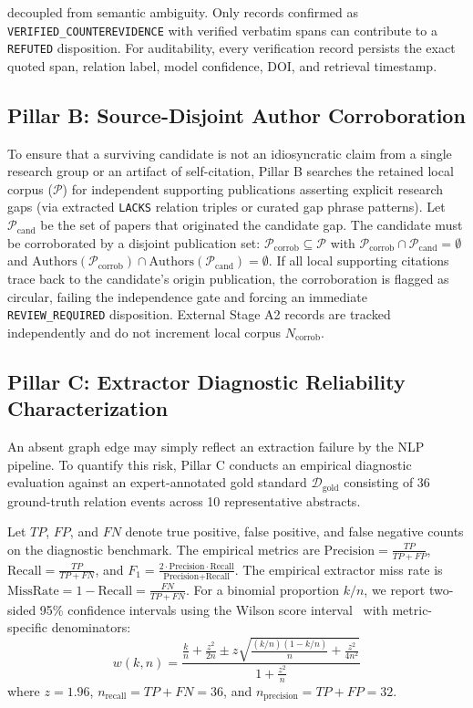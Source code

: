 \documentclass[runningheads]{llncs}
\begin{document}
decoupled from semantic ambiguity. Only records confirmed as \texttt{VERIFIED\_}\allowbreak\texttt{COUNTEREVIDENCE} with verified verbatim spans can contribute to a \texttt{REFUTED} disposition. For auditability, every verification record persists the exact quoted span, relation label, model confidence, DOI, and retrieval timestamp.

\subsection{Pillar B: Source-Disjoint Author Corroboration}
To ensure that a surviving candidate is not an idiosyncratic claim from a single research group or an artifact of self-citation, Pillar B searches the retained local corpus ($\mathcal{P}$) for independent supporting publications asserting explicit research gaps (via extracted \texttt{LACKS} relation triples or curated gap phrase patterns). Let $\mathcal{P}_{\text{cand}}$ be the set of papers that originated the candidate gap. The candidate must be corroborated by a disjoint publication set: $\mathcal{P}_{\text{corrob}} \subseteq \mathcal{P}$ with $\mathcal{P}_{\text{corrob}} \cap \mathcal{P}_{\text{cand}} = \emptyset$ and $\text{Authors}(\mathcal{P}_{\text{corrob}}) \cap \text{Authors}(\mathcal{P}_{\text{cand}}) = \emptyset$. If all local supporting citations trace back to the candidate's origin publication, the corroboration is flagged as circular, failing the independence gate and forcing an immediate \texttt{REVIEW\_REQUIRED} disposition. External Stage A2 records are tracked independently and do not increment local corpus $N_{\text{corrob}}$.

\subsection{Pillar C: Extractor Diagnostic Reliability Characterization}
\label{sec:pillar_c}

An absent graph edge may simply reflect an extraction failure by the NLP pipeline. To quantify this risk, Pillar C conducts an empirical diagnostic evaluation against an expert-annotated gold standard $\mathcal{D}_{\text{gold}}$ consisting of 36 ground-truth relation events across 10 representative abstracts.

Let $TP$, $FP$, and $FN$ denote true positive, false positive, and false negative counts on the diagnostic benchmark. The empirical metrics are $\text{Precision} = \frac{TP}{TP + FP}$, $\text{Recall} = \frac{TP}{TP + FN}$, and $F_1 = \frac{2 \cdot \text{Precision} \cdot \text{Recall}}{\text{Precision} + \text{Recall}}$. The empirical extractor miss rate is $\text{MissRate} = 1 - \text{Recall} = \frac{FN}{TP + FN}$. For a binomial proportion $k/n$, we report two-sided 95\% confidence intervals using the Wilson score interval~\cite{wilson1927} with metric-specific denominators:
\begin{equation}
w(k, n) = \frac{\frac{k}{n} + \frac{z^2}{2n} \pm z \sqrt{\frac{(k/n)(1-k/n)}{n} + \frac{z^2}{4n^2}}}{1 + \frac{z^2}{n}}
\end{equation}
where $z = 1.96$, $n_{\text{recall}} = TP + FN = 36$, and $n_{\text{precision}} = TP + FP = 32$.
\end{document}
